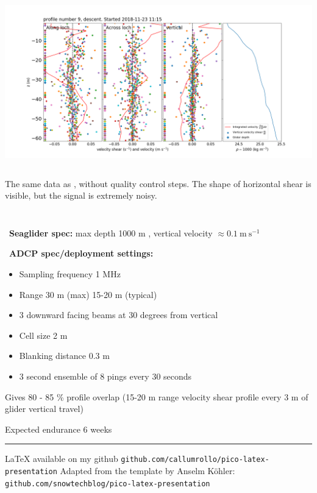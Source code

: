 \documentclass[unknownkeysallowed,usepdftitle=false]{beamer}
\newcommand{\secvariable}{nothing}
\newcommand{\mysection}[1]{\renewcommand{\secvariable}{#1}
}
\begin{document}
\begin{frame}\label{no_qc}
\vspace{-0.3cm}
\begin{center}
\includegraphics[trim=70 20 80 80,clip,width=\paperwidth]{figure/95_noqc.png}
\end{center}
\begin{columns}
\begin{column}[t]{0.9\textwidth}
The same data as \hyperlink{trial_shear}{}, without quality control steps. The shape of horizontal shear is visible, but the signal is extremely noisy.
\end{column}
\end{columns}
\end{frame}




\mysection{tech}
\begin{frame}\label{\secvariable}

\begin{columns}
\begin{column}[t]{0.9\textwidth}
\ \textbf{Seaglider spec:} max depth 1000 m , vertical velocity $\approx0.1\ \mathrm{m\ s^{-1}}$

\ \textbf{ADCP spec/deployment settings:}
\begin{itemize}
\item Sampling frequency 1 MHz 
\item Range 30 m (max) 15-20 m (typical)
\item 3 downward facing beams at 30 degrees from vertical 
\item Cell size 2 m
\item Blanking distance 0.3 m
\item 3 second ensemble of 8 pings every 30 seconds
\end{itemize}
Gives 80 - 85 \% profile overlap (15-20 m range velocity shear profile every 3 m of glider vertical travel)

Expected endurance 6 weeks
\noindent\rule[0.5ex]{\linewidth}{1pt}

\LaTeX{} available on my github  \texttt{github.com/callumrollo/pico-latex-presentation}
Adapted from the template by Anselm K\"ohler: \texttt{github.com/snowtechblog/pico-latex-presentation}
\end{column}
\end{columns}
\end{frame}
\end{document}
